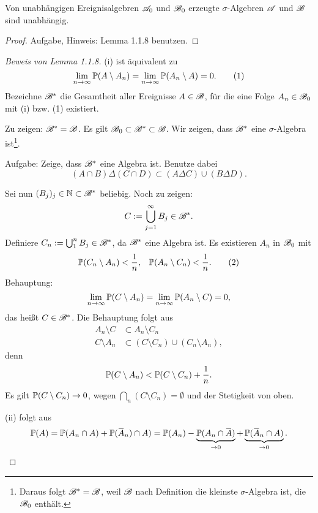 \begin{thm}
  Von unabhängigen Ereignisalgebren $\mathscr{A}_0$ und $\mathscr{B}_0$ erzeugte
  $\sigma$-Algebren $\mathscr{A}$ und $\mathscr{B}$ sind unabhängig.
\end{thm}

\begin{proof}
  Aufgabe, Hinweis: Lemma 1.1.8 benutzen.
\end{proof}

\begin{proof}[Beweis von Lemma 1.1.8]
  (i) ist äquivalent zu
  \[ \lim_{n \to \infty} \mathbb{P}( A \setminus A_n) = \lim_{n \to \infty} \mathbb{P}( A_n
    \setminus A ) = 0. \tag{1} \]
  Bezeichne $\mathscr{B}^*$ die Gesamtheit aller Ereignisse $A \in \mathscr{B}$, für die eine
  Folge $A_n \in \mathscr{B}_0$ mit (i) bzw. (1) existiert.

  Zu zeigen: $\mathscr{B}^* = \mathscr{B}$. Es gilt $\mathscr{B}_0 \subset \mathscr{B}^* \subset \mathscr{B}$. Wir
  zeigen, dass $\mathscr{B}^*$ eine $\sigma$-Algebra ist\footnote{%
    Daraus folgt $\mathscr{B}^* = \mathscr{B}$, weil $\mathscr{B}$ nach Definition die kleinste
    $\sigma$-Algebra ist, die $\mathscr{B}_0$ enthält.}.

  Aufgabe: Zeige, dass $\mathscr{B}^*$ eine Algebra ist. Benutze dabei
  \[ (A \cap B) \Delta (C \cap D) \subset (A \Delta C) \cup (B \Delta D). \]

  Sei nun $(B_j)_j \in \mathbb{N} \subset \mathscr{B}^*$ beliebig. Noch zu zeigen:
  \[ C := \bigcup_{j=1}^\infty  B_j \in \mathscr{B}^*. \]
  Definiere $C_n := \bigcup_1^n B_j \in \mathscr{B}^*$, da $\mathscr{B}^*$ eine Algebra ist. Es
  existieren $A_n$ in $\mathscr{B}_0$ mit
  \begin{align*}
    \mathbb{P}( C_n \setminus A_n ) &< \frac{1}{n}, & \mathbb{P}(A_n \setminus C_n ) < \frac{1}{n}. \tag{2}
  \end{align*}
  Behauptung:
  \[ \lim_{n \to \infty} \mathbb{P}( C \setminus A_n ) = \lim_{n \to \infty} \mathbb{P}( A_n
    \setminus C ) = 0, \]
  das heißt $C \in \mathscr{B}^*$. Die Behauptung folgt aus
  \begin{align*}
    A_n \setminus C &\subset A_n \setminus C_n \\
    C \setminus A_n &\subset ( C\setminus C_n ) \cup (C_n \setminus A_n),
  \end{align*}
  denn
  \[ \mathbb{P}( C \setminus A_n ) < \mathbb{P}( C \setminus C_n ) + \frac{1}{n}. \]
  Es gilt $\mathbb{P}( C \setminus C_n ) \to 0$, wegen $\bigcap_n(C \setminus C_n) =
  \emptyset$ und der Stetigkeit von oben.

  (ii) folgt aus
  \[ \pP(A) = \pP( A_n \cap A ) + \pP( \obar{A}_n ) \cap A ) = \pP(A_n) -
    \underbrace{\pP( A_n \cap \obar{A} )}_{\to 0} +
    \underbrace{\pP( \obar{A}_n \cap A )}_{\to 0}. \qedhere \]
\end{proof}

